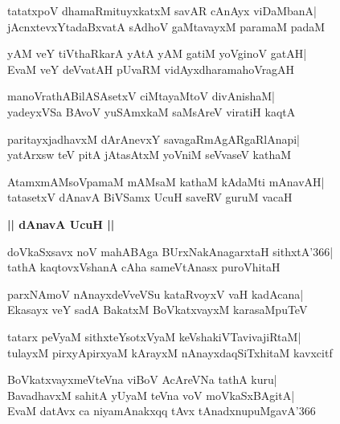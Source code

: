 \documentclass[twoside,12pt,openright]{book}
\newcounter{shloka}[chapter]
\def\uvaca#1{\centerline{{\large\textbf{#1}}}}
\begin{document}
\begin{shloka}%
tatatxpoV dhamaRmituyxkatxM savAR cAnAyx viDaMbanA|\\
jAcnxtevxYtadaBxvatA sAdhoV gaMtavayxM paramaM padaM
\end{shloka}

\begin{shloka}%
yAM veY tiVthaRkarA yAtA yAM gatiM yoVginoV gatAH|\\
EvaM veY deVvatAH pUvaRM vidAyxdharamahoVragAH
\end{shloka}

\begin{shloka}%
manoVrathABilASAsetxV ciMtayaMtoV divAnishaM|\\
yadeyxVSa BAvoV yuSAmxkaM saMsAreV viratiH kaqtA
\end{shloka}

\begin{shloka}%
paritayxjadhavxM dArAnevxY savagaRmAgARgaRlAnapi|\\
yatArxsw teV pitA jAtasAtxM yoVniM seVvaseV kathaM
\end{shloka}

\begin{shloka}%
AtamxmAMsoVpamaM mAMsaM kathaM kAdaMti mAnavAH|\\
tatasetxV dAnavA BiVSamx UcuH saveRV guruM vacaH
\end{shloka}

\uvaca{|| dAnavA UcuH ||}
\begin{shloka}%
doVkaSxsavx noV mahABAga BUrxNakAnagarxtaH sithxtA\char'366|\\
tathA kaqtovxVshanA cAha sameVtAnasx puroVhitaH
\end{shloka}

\begin{shloka}%
parxNAmoV nAnayxdeVveVSu kataRvoyxV vaH kadAcana|\\
Ekasayx veY sadA BakatxM BoVkatxvayxM karasaMpuTeV
\end{shloka}

\begin{shloka}%
tatarx peVyaM sithxteYsotxVyaM keVshakiVTavivajiRtaM|\\
tulayxM pirxyApirxyaM kArayxM nAnayxdaqSiTxhitaM kavxcitf
\end{shloka}

\begin{shloka}%
BoVkatxvayxmeVteVna viBoV AcAreVNa tathA kuru|\\
BavadhavxM sahitA yUyaM teVna voV moVkaSxBAgitA|\\
EvaM datAvx ca niyamAnakxqq tAvx tAnadxnupuMgavA\char'366
\end{shloka}
\end{document}
